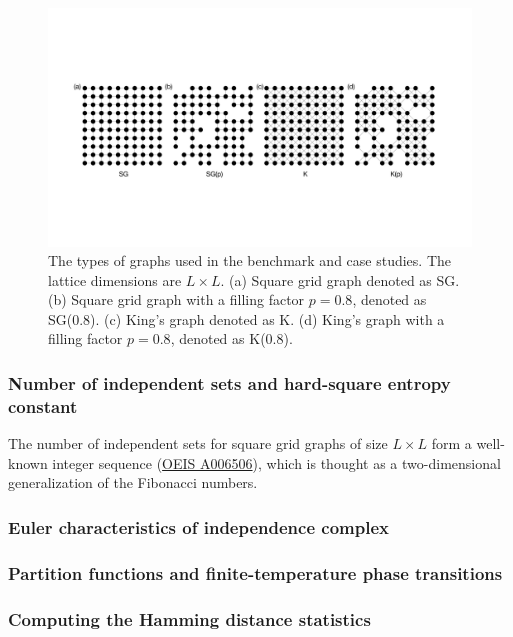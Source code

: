 \documentclass[onefignum, onetabnum]{siamart190516}
\newcommand{\<}{\langle}
\renewcommand{\>}{\rangle}
\begin{document}
\begin{figure}[t] 
    \centering
    \includegraphics[width=\textwidth, trim={0cm 0cm 0cm 0cm}, clip]{lattices.pdf}
    \caption{The types of graphs used in the benchmark and case studies.
    The lattice dimensions are $L\times L$. (a) Square grid graph denoted as SG. (b) Square grid graph with a filling factor $p=0.8$, denoted as SG(0.8).
    (c) King's graph denoted as K. (d) King's graph with a filling factor $p=0.8$, denoted as K(0.8).}
    \label{fig:lattices}
\end{figure}

\subsubsection{Number of independent sets and hard-square entropy constant}
The number of independent sets for square grid graphs of size $L \times L$ form a well-known integer sequence (\href{https://oeis.org/A006506}{OEIS A006506}), which is thought as a two-dimensional generalization of the Fibonacci numbers.

\subsubsection{Euler characteristics of independence complex}

\subsubsection{Partition functions and finite-temperature phase transitions}

\subsubsection{Computing the Hamming distance statistics}
\end{document}
